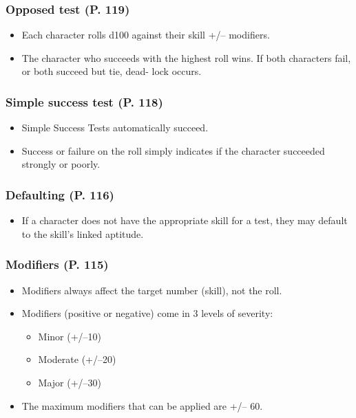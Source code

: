 \subsubsection{Opposed test (P. 119)} 

\begin{itemize} \item Each character rolls d100 against their skill +/– modifiers. \item The character who succeeds with the highest roll wins. If both characters fail, or both succeed but tie, dead- lock occurs. \end{itemize} 

\subsubsection{Simple success test (P. 118)} 

\begin{itemize} \item Simple Success Tests automatically succeed. \item Success or failure on the roll simply indicates if the character succeeded strongly or poorly. \end{itemize} 

\subsubsection{Defaulting (P. 116)} 

\begin{itemize} \item If a character does not have the appropriate skill for a test, they may default to the skill’s linked aptitude. \end{itemize} 

\subsubsection{Modifiers (P. 115)} 

\begin{itemize} \item Modifiers always affect the target number (skill), not the roll. \item Modifiers (positive or negative) come in 3 levels of severity: \begin{itemize} \item Minor (+/–10) \item Moderate (+/–20) \item Major (+/–30) \end{itemize} \item The maximum modifiers that can be applied are +/– 60. \end{itemize} 

